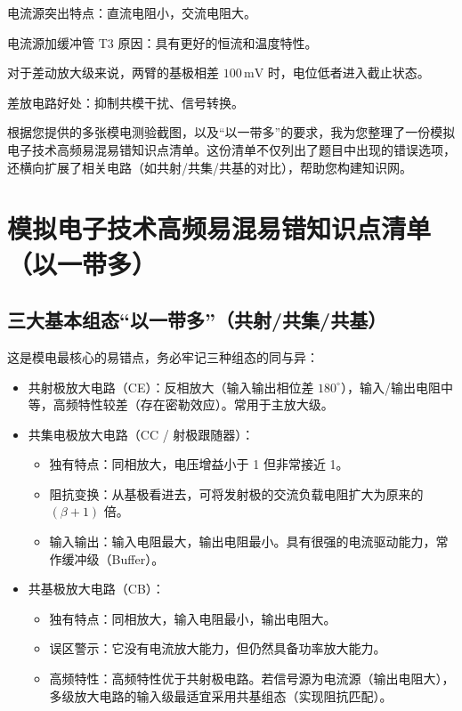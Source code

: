 \documentclass[UTF8,fontset=fandol,zihao=5]{ctexart}
\begin{document}
{电流源突出特点：直流电阻小，交流电阻大。

电流源加缓冲管 T3 原因：具有更好的恒流和温度特性。

对于差动放大级来说，两臂的基极相差 $100\,\mathrm{mV}$ 时，电位低者进入截止状态。

差放电路好处：抑制共模干扰、信号转换。

根据您提供的多张模电测验截图，以及“以一带多”的要求，我为您整理了一份模拟电子技术高频易混易错知识点清单。这份清单不仅列出了题目中出现的错误选项，还横向扩展了相关电路（如共射/共集/共基的对比），帮助您构建知识网。

\section{模拟电子技术高频易混易错知识点清单（以一带多）}

\subsection{三大基本组态“以一带多”（共射/共集/共基）}

这是模电最核心的易错点，务必牢记三种组态的同与异：

\begin{itemize}
  \item 共射极放大电路（CE）：反相放大（输入输出相位差 $180^\circ$），输入/输出电阻中等，高频特性较差（存在密勒效应）。常用于主放大级。

  \item 共集电极放大电路（CC / 射极跟随器）：
  \begin{itemize}
    \item 独有特点：同相放大，电压增益小于 1 但非常接近 1。
    \item 阻抗变换：从基极看进去，可将发射极的交流负载电阻扩大为原来的 $(\beta+1)$ 倍。
    \item 输入输出：输入电阻最大，输出电阻最小。具有很强的电流驱动能力，常作缓冲级（Buffer）。
  \end{itemize}

  \item 共基极放大电路（CB）：
  \begin{itemize}
    \item 独有特点：同相放大，输入电阻最小，输出电阻大。
    \item 误区警示：它没有电流放大能力，但仍然具备功率放大能力。
    \item 高频特性：高频特性优于共射极电路。若信号源为电流源（输出电阻大），多级放大电路的输入级最适宜采用共基组态（实现阻抗匹配）。
  \end{itemize}


\end{itemize}}
\end{document}
